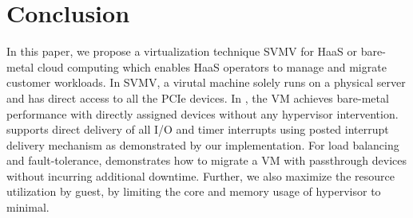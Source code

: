 \section{Conclusion}

In this paper, we propose a virtualization technique SVMV
for HaaS or bare-metal cloud computing which enables
HaaS operators to manage and migrate customer workloads.
In SVMV, a virutal machine solely runs on a 
physical server and has direct access to all the PCIe devices. 
In \sna, the VM achieves bare-metal performance with 
directly assigned devices without any hypervisor 
intervention. \sna supports direct delivery of all I/O 
and timer interrupts using posted interrupt
delivery mechanism as demonstrated by our implementation.
For load balancing and 
fault-tolerance, \sna demonstrates how 
to migrate a VM with passthrough devices without incurring 
additional downtime. Further, we also maximize the 
resource utilization by guest, by limiting 
the core and memory usage of hypervisor to minimal.
